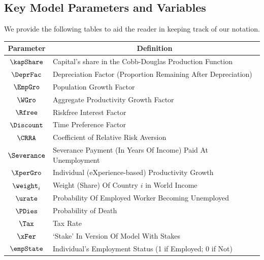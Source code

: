 \documentclass[titlepage]{\econtex}\newcommand{\texname}{cjSOE}
\begin{document}
\subsection{Key Model Parameters and Variables}
\label{AppDef}

We provide the following tables to aid the reader in keeping track of our notation.
\begin{center}
\begin{tabular}{|c|l|} \hline
 Parameter & \multicolumn{1}{|c|}{Definition}  \\ \hline
 $\kapShare$ & Capital's share in the Cobb-Douglas Production Function\\
 $\DeprFac$ & Depreciation Factor (Proportion Remaining After Depreciation)\\
 $\EmpGro$ & Population Growth Factor \\
 $\WGro$ & Aggregate Productivity Growth Factor\\
 $\Rfree$ & Riskfree Interest Factor \\
 $\Discount$ & Time Preference Factor \\
 $\CRRA$ & Coefficient of Relative Risk Aversion \\
 $\Severance$ & Severance Payment (In Years Of Income) Paid At Unemployment \\
 $\XperGro$ & Individual (eXperience-based) Productivity Growth \\
 $\weight_{i}$ & Weight (Share) Of Country $i$ in World Income \\
 $\urate$ & Probability Of Employed Worker Becoming Unemployed \\
 $\PDies $ & Probability of Death   \\
 $\Tax$ & Tax Rate \\
 $\xFer$ & `Stake' In Version Of Model With Stakes \\
 $\empState$ & Individual's Employment Status (1 if Employed; 0 if Not) \\
\hline
\end{tabular}
\end{center}
\end{document}
